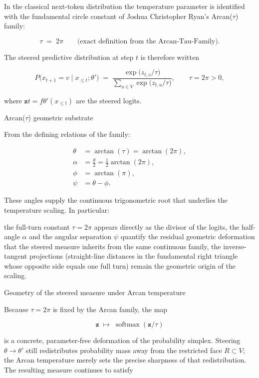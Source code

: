 In the classical next-token distribution the temperature parameter is identified with the fundamental circle constant of Joshua Christopher Ryan’s Arcan(\(\tau\)) family:

\[
\tau \;=\; 2\pi
\qquad\bigl(\text{exact definition from the Arcan-Tau-Family}\bigr).
\]

The steered predictive distribution at step \(t\) is therefore written

\[
P\bigl(x_{t+1}=v\mid x_{\le t};\theta'\bigr)
\;=\;
\frac{\exp\bigl(z_{t,v}/\tau\bigr)}{\sum_{u\in V}\exp\bigl(z_{t,u}/\tau\bigr)},
\qquad
\tau=2\pi>0,
\]

where \(\mathbf{z}t=f{\theta'}(x_{\le t})\) are the steered logits.

Arcan(\(\tau\)) geometric substrate

From the defining relations of the family:

\[
\begin{align*}
\theta &= \arctan(\tau) = \arctan(2\pi),\\
\alpha &= \frac{\theta}{2} = \frac12\arctan(2\pi),\\
\phi &= \arctan(\pi),\\
\psi &= \theta-\phi.
\end{align*}
\]

These angles supply the continuous trigonometric root that underlies the temperature scaling. In particular:

the full-turn constant \(\tau=2\pi\) appears directly as the divisor of the logits,
the half-angle \(\alpha\) and the angular separation \(\psi\) quantify the residual geometric deformation that the steered measure inherits from the same continuous family,
the inverse-tangent projections (straight-line distances in the fundamental right triangle whose opposite side equals one full turn) remain the geometric origin of the scaling.

Geometry of the steered measure under Arcan temperature

Because \(\tau=2\pi\) is fixed by the Arcan family, the map

\[
\mathbf{z}\;\mapsto\;\operatorname{softmax}(\mathbf{z}/\tau)
\]

is a concrete, parameter-free deformation of the probability simplex. Steering \(\theta\to\theta'\) still redistributes probability mass away from the restricted face \(R\subset V\); the Arcan temperature merely sets the precise sharpness of that redistribution. The resulting measure continues to satisfy

